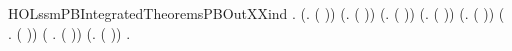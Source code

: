 \begin{SaveVerbatim}{HOLssmPBIntegratedTheoremsPBOutXXind}
\HOLTokenTurnstile{} \HOLSymConst{\HOLTokenForall{}}.
     (\HOLSymConst{\HOLTokenForall{}}.   ( )) \HOLSymConst{\HOLTokenConj{}} (\HOLSymConst{\HOLTokenForall{}}.   ( )) \HOLSymConst{\HOLTokenConj{}}
     (\HOLSymConst{\HOLTokenForall{}}.   ( )) \HOLSymConst{\HOLTokenConj{}}
     (\HOLSymConst{\HOLTokenForall{}}.   ( )) \HOLSymConst{\HOLTokenConj{}} (\HOLSymConst{\HOLTokenForall{}}.   ( )) \HOLSymConst{\HOLTokenConj{}}
     (\HOLSymConst{\HOLTokenForall{}} .   ( )) \HOLSymConst{\HOLTokenConj{}} (\HOLSymConst{\HOLTokenForall{}} .   ( )) \HOLSymConst{\HOLTokenConj{}}
     (\HOLSymConst{\HOLTokenForall{}}.   ( )) \HOLSymConst{\HOLTokenImp{}}
     \HOLSymConst{\HOLTokenForall{}} .   
\end{SaveVerbatim}
\newcommand{\HOLssmPBIntegratedTheoremsPBOutXXind}{\UseVerbatim{HOLssmPBIntegratedTheoremsPBOutXXind}}
